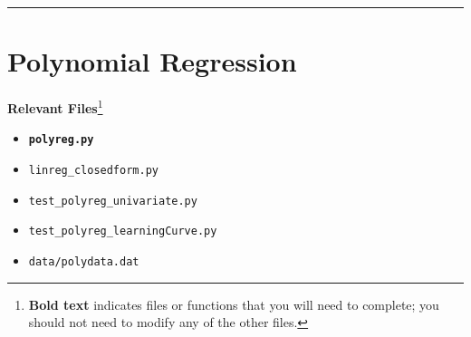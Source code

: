 \documentclass{article}
\begin{document}
\rule{\textwidth}{0.25pt}

\newpage
\section*{Polynomial Regression}
{\bf Relevant Files}\footnote{{\bf Bold text} indicates files or functions that you will need to complete; you should not need to modify any of the other files.}
\vspace{-1.2em}
\begin{multicols}{2}
    \begin{itemize}[noitemsep,nolistsep]
        \item \texttt{\bf polyreg.py}
        \item \texttt{linreg\_closedform.py}
        \item \texttt{test\_polyreg\_univariate.py}
        \item \texttt{test\_polyreg\_learningCurve.py}
        \item \texttt{data/polydata.dat}
    \end{itemize}
\end{multicols}
\end{document}
